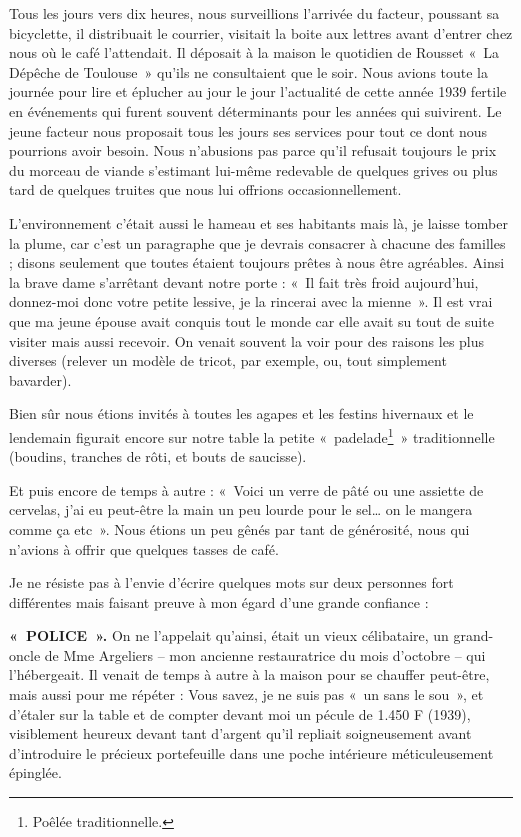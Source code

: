 Tous les jours vers dix heures, nous surveillions l’arrivée du facteur, poussant sa
bicyclette, il distribuait le courrier, visitait la boite aux lettres avant d’entrer chez
nous où le café l’attendait. Il déposait à la maison le quotidien de Rousset «~La
Dépêche de Toulouse~» qu’ils ne consultaient que le soir. Nous avions toute la
journée pour lire et éplucher au jour le jour l’actualité de cette année 1939 fertile en
événements qui furent souvent déterminants pour les années qui suivirent. Le jeune
facteur nous proposait tous les jours ses services pour tout ce dont nous pourrions
avoir besoin. Nous n’abusions pas parce qu’il refusait toujours le prix du morceau de
viande s’estimant lui-même redevable de quelques grives ou plus tard de quelques
truites que nous lui offrions occasionnellement.


L’environnement c’était aussi le hameau et ses habitants mais là, je laisse tomber la
plume, car c’est un paragraphe que je devrais consacrer à chacune des familles ;
disons seulement que toutes étaient toujours prêtes à nous être agréables. Ainsi la
brave dame s’arrêtant devant notre porte : «~Il fait très froid aujourd’hui, donnez-moi
donc votre petite lessive, je la rincerai avec la mienne~». Il est vrai que ma jeune
épouse avait conquis tout le monde car elle avait su tout de suite visiter mais aussi
recevoir. On venait souvent la voir pour des raisons les plus diverses (relever un
modèle de tricot, par exemple, ou, tout simplement bavarder).

Bien sûr nous étions invités à toutes les agapes et les festins hivernaux et le
lendemain figurait encore sur notre table la petite «~padelade\footnote{Poêlée traditionnelle.}~» traditionnelle
(boudins, tranches de rôti, et bouts de saucisse).

Et puis encore de temps à autre : «~Voici un verre de pâté ou une assiette de cervelas,
j’ai eu peut-être la main un peu lourde pour le sel… on le mangera comme ça
etc~». Nous étions un peu gênés par tant de générosité, nous qui n’avions à
offrir que quelques tasses de café.

Je ne résiste pas à l’envie d’écrire quelques mots sur deux personnes fort différentes
mais faisant preuve à mon égard d’une grande confiance :

\textbf{«~POLICE~».} On ne l’appelait qu’ainsi, était un vieux célibataire, un grand-oncle de
Mme Argeliers -- mon ancienne restauratrice du mois d’octobre -- qui l’hébergeait. Il
venait de temps à autre à la maison pour se chauffer peut-être, mais aussi pour me
répéter : Vous savez, je ne suis pas «~un sans le sou~», et d’étaler sur la table et de
compter devant moi un pécule de 1.450 F (1939), visiblement heureux devant tant
d’argent qu’il repliait soigneusement avant d’introduire le précieux portefeuille dans
une poche intérieure méticuleusement épinglée.

